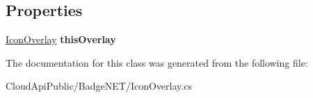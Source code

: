 \subsection*{Properties}
\begin{DoxyCompactItemize}
\item 
\hypertarget{class_cloud_api_public_1_1_badge_n_e_t_1_1_icon_overlay_1_1badge_params_1_1base_params_ab384301a8a76e8a5c03d6c204d76061a}{\hyperlink{class_cloud_api_public_1_1_badge_n_e_t_1_1_icon_overlay}{Icon\-Overlay} {\bfseries this\-Overlay}}\label{class_cloud_api_public_1_1_badge_n_e_t_1_1_icon_overlay_1_1badge_params_1_1base_params_ab384301a8a76e8a5c03d6c204d76061a}

\end{DoxyCompactItemize}


The documentation for this class was generated from the following file\-:\begin{DoxyCompactItemize}
\item 
Cloud\-Api\-Public/\-Badge\-N\-E\-T/Icon\-Overlay.\-cs\end{DoxyCompactItemize}
